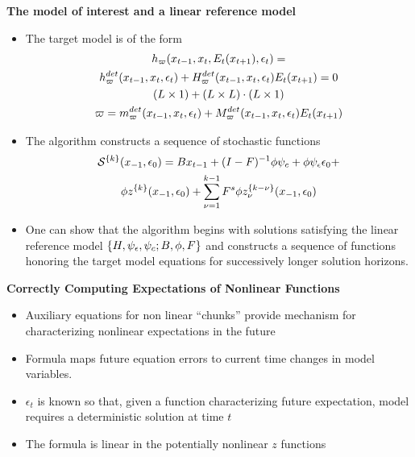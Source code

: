 \documentclass[12pt]{article}
\begin{document}


{\bf The model of interest and a linear reference model}

\begin{itemize}
\item The target model is of the form
\begin{gather}
\nlEqnLHS{x_{t-1}}{x_t}{x_{t+1}}{t}=\\
\nlEqn{x_{t-1}}{x_t}{x_{t+1}}{t}=0\\ \label{refMod}
 (L \times 1) +  (L \times L ) \cdot (L \times 1)\\
\nlEqnSel{x_{t-1}}{x_t}{x_{t+1}}{t}\\ 
\end{gather}



\item The algorithm constructs a sequence of stochastic 
functions 
  \begin{gather}
	 \stochF{k}\initXE =B x_{t-1}+ (I - F)^{-1} \phi \psi_c+  \phi \psi_\epsilon\epsilon_0  +\\ \phi z^{\{k\}}\initXE+ \sum_{\sForSum=1}^{k-1} F^s \phi z^{\{k-\nu\}}_{\sForSum}\initXE 
\label{theSeries}
  \end{gather}

\item One can show that the algorithm begins with solutions satisfying 
the linear reference model $\linModMats$ and
constructs a sequence of functions
 honoring the target model equations for successively 
longer solution horizons.
  \end{itemize}




  {\bf Correctly Computing Expectations of Nonlinear Functions}


  \begin{itemize}
\item Auxiliary equations for non linear ``chunks'' provide mechanism for characterizing  nonlinear expectations in the future
  \item Formula maps future equation errors  to current time changes in model
variables.
\item  $\epsilon_t$ is known so that,
given a function characterizing future expectation,  model requires
a deterministic solution at time $t$
\item The formula is linear in the potentially nonlinear $z$ functions
  \end{itemize}
\end{document}
